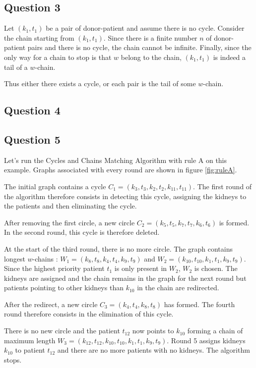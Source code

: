 \documentclass[english]{article}
\begin{document}
\subsection*{Question 3}

Let $(k_1,t_1)$ be a pair of donor-patient and assume there is no cycle. Consider the chain starting from $(k_1,t_1)$. Since there is a finite number $n$ of donor-patient pairs and there is no cycle, the chain cannot be infinite. Finally, since the only way for a chain to stop is that $w$ belong to the chain, $(k_1,t_1)$ is indeed a tail of a $w$-chain.

Thus either there exists a cycle, or each pair is the tail of some $w$-chain.

\subsection*{Question 4}

\subsection*{Question 5}

Let's run the Cycles and Chains Matching Algorithm with rule A on this example. Graphs associated with every round are shown in figure \ref{fig:ruleA}.

The initial graph contains a cycle $C_1 = (k_3, t_3, k_2, t_2, k_{11}, t_{11})$. The first round of the algorithm therefore consists in detecting this cycle, assigning the kidneys to the patients and then eliminating the cycle.

After removing the first circle, a new circle $C_2 = (k_5, t_5, k_7, t_7, k_6, t_6)$ is formed. In the second round, this cycle is therefore deleted.

At the start of the third round, there is no more circle. The graph contains longest $w$-chains : $W_1 = (k_8, t_8, k_4, t_4, k_9, t_9)$ and $W_2 = (k_{10}, t_{10}, k_1, t_1, k_9, t_9)$. Since the highest priority patient $ t_1 $ is only present in $W_2$,  $W_2$ is chosen. The kidneys are assigned and the chain remains in the graph for the next round but patients pointing to other kidneys than $k_10$ in the chain are redirected.

After the redirect, a new circle $ C_3 = (k_4, t_4, k_8, t_8)$ has formed. The fourth round therefore consists in the elimination of this cycle.

There is no new circle and the patient $ t_{12} $ now points to $ k_{10} $ forming a chain of maximum length $ W_3 = (k_{12}, t_{12}, k_{10}, t_{10}, k_1, t_1, k_9, t_9) $. Round 5 assigns kidneys $ k_{10} $ to patient $ t_{12} $ and there are no more patients with no kidneys. The algorithm stops.
\end{document}
